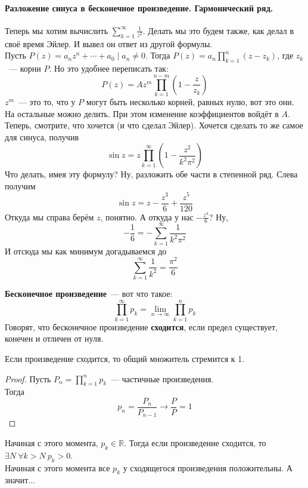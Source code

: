 \documentclass{article}
\begin{document}
    \paragraph{Разложение синуса в бесконечное произведение. Гармонический ряд.}
    \begin{remark}
        Теперь мы хотим вычислить $\sum\limits_{k=1}^\infty\frac1{z^2}$. Делать мы это будем также, как делал в своё время Эйлер. И вывел он ответ из другой формулы.\\
        Пусть $P(z)=a_nz^n+\cdots+a_0\mid a_n\neq0$. Тогда $P(z)=a_n\prod\limits_{k=1}^n(z-z_k)$, где $z_k$~--- корни $P$. Но это удобнее переписать так:
        $$
        P(z)=Az^m\prod_{k=1}^{n-m}\left(1-\frac z{z_k}\right)
        $$
        $z^m$~--- это то, что у $P$ могут быть несколько корней, равных нулю, вот это они. На остальные можно делить. При этом изменение коэффициентов войдёт в $A$.\\
        Теперь, смотрите, что хочется (и что сделал Эйлер). Хочется сделать то же самое для синуса, получив
        $$\sin z=z\prod\limits_{k=1}^\infty\left(1-\frac{z^2}{k^2\pi^2}\right)$$
        Что делать, имея эту формулу? Ну, разложить обе части в степенной ряд. Слева получим
        $$
        \sin z=z-\frac{z^3}6+\frac{z^5}{120}
        $$
        Откуда мы справа берём $z$, понятно. А откуда у нас $-\frac{z^3}6$? Ну,
        $$
        -\frac16=-\sum\limits_{k=1}^\infty\frac1{k^2\pi^2}
        $$
        И отсюда мы как минимум догадываемся до
        $$
        \sum\limits_{k=1}^\infty\frac1{k^2}=\frac{\pi^2}6
        $$
    \end{remark}
    \begin{definition}
        \textbf{Бесконечное произведение}~--- вот что такое:
        $$
        \prod\limits_{k=1}^\infty p_k=\lim\limits_{n\to\infty}\prod\limits_{k=1}^np_k
        $$
        Говорят, что бесконечное произведение \textbf{сходится}, если предел существует, конечен и отличен от нуля.
    \end{definition}
    \begin{property}
        Если произведение сходится, то общий множитель стремится к 1.
    \end{property}
    \begin{proof}
        Пусть $P_n=\prod\limits_{k=1}^np_k$~--- частичные произведения.\\
        Тогда
        $$p_n=\frac{P_n}{P_{n-1}}\rightarrow\frac PP=1$$
    \end{proof}
    \begin{remark}
        Начиная с этого момента, $p_k\in\mathbb R$. Тогда если произведение сходится, то
        $\exists N~\forall k>N~p_k>0$.\\
        Начиная с этого момента все $p_k$ у сходящегося произведения положительны. А значит...
    \end{remark}
\end{document}
